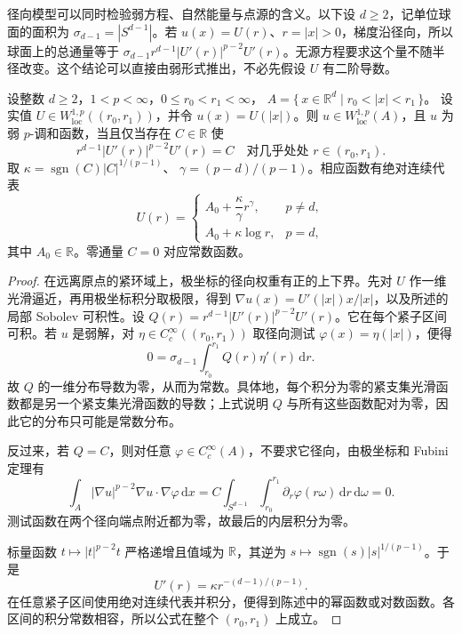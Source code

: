 径向模型可以同时检验弱方程、自然能量与点源的含义。以下设 \(d\ge2\)，记单位球面的面积为
\(\sigma_{d-1}=|S^{d-1}|\)。若 \(u(x)=U(r)\)、\(r=|x|>0\)，梯度沿径向，所以球面上的总通量等于
\(\sigma_{d-1}r^{d-1}|U'(r)|^{p-2}U'(r)\)。无源方程要求这个量不随半径改变。这个结论可以直接由弱形式推出，不必先假设 \(U\) 有二阶导数。

\begin{proposition}[径向弱解与恒定通量]
\label{b2:prop:H2-radial-flux}
设整数 \(d\ge2\)，\(1<p<\infty\)，\(0\le r_0<r_1<\infty\)，
\(A=\{\,x\in\mathbb R^d\mid r_0<|x|<r_1\,\}\)。
设实值 \(U\in W^{1,p}_{\mathrm{loc}}((r_0,r_1))\)，并令 \(u(x)=U(|x|)\)。则 \(u\in W^{1,p}_{\mathrm{loc}}(A)\)，且 \(u\) 为弱 \(p\)-调和函数，当且仅当存在 \(C\in\mathbb R\) 使
\[
 r^{d-1}|U'(r)|^{p-2}U'(r)=C
 \quad\text{对几乎处处 }r\in(r_0,r_1).
\]
取 \(\kappa=\operatorname{sgn}(C)|C|^{1/(p-1)}\)、
\(\gamma=(p-d)/(p-1)\)。相应函数有绝对连续代表
\[
 U(r)=
 \begin{cases}
 A_0+\dfrac{\kappa}{\gamma}r^\gamma,&p\ne d,\\[3pt]
 A_0+\kappa\log r,&p=d,
 \end{cases}
\]
其中 \(A_0\in\mathbb R\)。零通量 \(C=0\) 对应常数函数。
\end{proposition}
\begin{proof}
在远离原点的紧环域上，极坐标的径向权重有正的上下界。先对 \(U\) 作一维光滑逼近，再用极坐标积分取极限，得到
\(\nabla u(x)=U'(|x|)x/|x|\)，以及所述的局部 Sobolev 可积性。设
\(Q(r)=r^{d-1}|U'(r)|^{p-2}U'(r)\)。它在每个紧子区间可积。若 \(u\) 是弱解，对 \(\eta\in C_c^\infty((r_0,r_1))\) 取径向测试 \(\varphi(x)=\eta(|x|)\)，便得
\[
 0=\sigma_{d-1}\int_{r_0}^{r_1}Q(r)\eta'(r)\,\mathrm dr.
\]
故 \(Q\) 的一维分布导数为零，从而为常数。具体地，每个积分为零的紧支集光滑函数都是另一个紧支集光滑函数的导数；上式说明 \(Q\) 与所有这些函数配对为零，因此它的分布只可能是常数分布。

反过来，若 \(Q=C\)，则对任意 \(\varphi\in C_c^\infty(A)\)，不要求它径向，由极坐标和 Fubini 定理有
\[
 \int_A|\nabla u|^{p-2}\nabla u\cdot\nabla\varphi\,\mathrm dx
 =C\int_{S^{d-1}}\int_{r_0}^{r_1}
       \partial_r\varphi(r\omega)\,\mathrm dr\,\mathrm d\omega=0.
\]
测试函数在两个径向端点附近都为零，故最后的内层积分为零。

标量函数 \(t\mapsto|t|^{p-2}t\) 严格递增且值域为 \(\mathbb R\)，其逆为 \(s\mapsto\operatorname{sgn}(s)|s|^{1/(p-1)}\)。于是
\[
 U'(r)=\kappa r^{-(d-1)/(p-1)}.
\]
在任意紧子区间使用绝对连续代表并积分，便得到陈述中的幂函数或对数函数。各区间的积分常数相容，所以公式在整个 \((r_0,r_1)\) 上成立。
\end{proof}

